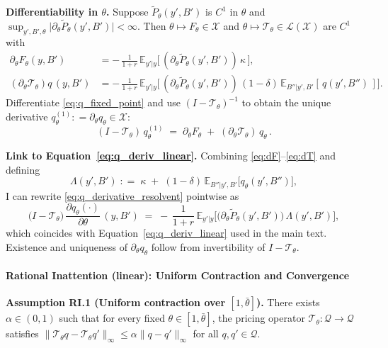 \documentclass[12pt]{article}
\providecommand{\coloneqq}{\mathrel{\mathop:}=}
\theoremstyle{plain}
\newcommand{\E}{\mathbb{E}}
\begin{document}
\textbf{Differentiability in \(\theta\).} Suppose \(\tilde P_\theta(y',B')\) is \(C^1\) in \(\theta\) and \(\sup_{y',B',\theta}\big|\partial_\theta \tilde P_\theta(y',B')\big|<\infty\). Then \(\theta\mapsto F_\theta\in\mathcal X\) and \(\theta\mapsto \mathcal T_\theta\in\mathcal L(\mathcal X)\) are \(C^1\) with
\begin{align}
	\partial_\theta F_\theta(y,B')               & = -\,\frac{1}{1+r}\,\E_{y'|y}\big[\,(\partial_\theta \tilde P_\theta(y',B'))\,\kappa\,\big], \label{eq:dF}                                   \\
	(\partial_\theta \mathcal T_\theta)q\,(y,B') & = -\,\frac{1}{1+r}\,\E_{y'|y}\Big[\,(\partial_\theta \tilde P_\theta(y',B'))\,(1-\delta)\,\E_{B''|y',B'}[\,q(y',B'')\,] \Big]. \label{eq:dT}
\end{align}
Differentiate \eqref{eq:q_fixed_point} and use \((I-\mathcal T_\theta)^{-1}\) to obtain the unique derivative \(q_\theta^{(1)}\coloneqq\partial_\theta q_\theta\in\mathcal X\):
\begin{equation}\label{eq:q_derivative_resolvent}
	(I-\mathcal T_\theta)\,q_\theta^{(1)}\;=\;\partial_\theta F_\theta\;+\;(\partial_\theta \mathcal T_\theta)\,q_\theta\,.
\end{equation}

\textbf{Link to Equation~\eqref{eq:q_deriv_linear}.} Combining \eqref{eq:dF}–\eqref{eq:dT} and defining
\begin{equation}\label{eq:Lambda_def}
	\Lambda(y',B')\;\coloneqq\;\kappa\;+\;(1-\delta)\,\E_{B''|y',B'}\big[q_\theta(y',B'')\big],
\end{equation}
I can rewrite \eqref{eq:q_derivative_resolvent} pointwise as
\begin{equation}\label{eq:q_deriv_linear_appendix}
	\big(I-\mathcal T_\theta\big)\,\frac{\partial q_\theta(\cdot)}{\partial\theta}\,(y,B')\;=\;-\,\frac{1}{1+r}\,\E_{y'|y}\Big[\big(\partial_\theta \tilde P_\theta(y',B')\big)\,\Lambda(y',B')\Big],
\end{equation}
which coincides with Equation~\eqref{eq:q_deriv_linear} used in the main text. Existence and uniqueness of \(\partial_\theta q_\theta\) follow from invertibility of \(I-\mathcal T_\theta\).

\paragraph{Rational Inattention (linear): Uniform Contraction and Convergence}
\noindent\textbf{Assumption RI.1 (Uniform contraction over $[1,\bar\theta]$).} There exists $\alpha\in(0,1)$ such that for every fixed $\theta\in[1,\bar\theta]$, the pricing operator $\mathcal T_\theta: \mathcal Q\to\mathcal Q$ satisfies $\|\mathcal T_\theta q - \mathcal T_\theta q'\|_\infty \le \alpha \|q-q'\|_\infty$ for all $q,q'\in\mathcal Q$.
\end{document}
